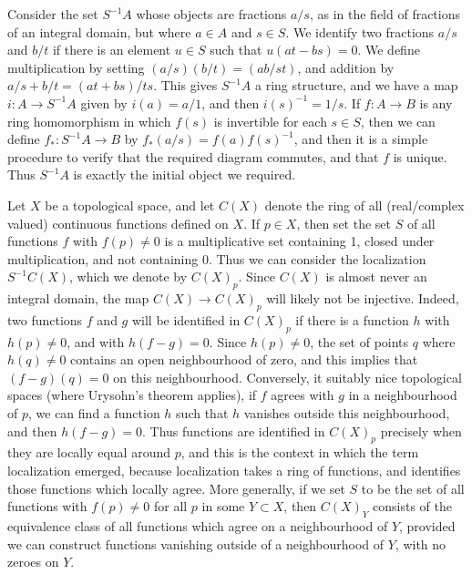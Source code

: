 Consider the set $S^{-1}A$ whose objects are fractions $a/s$, as in the field of fractions of an integral domain, but where $a \in A$ and $s \in S$. We identify two fractions $a/s$ and $b/t$ if there is an element $u \in S$ such that $u(at - bs) = 0$. We define multiplication by setting $(a/s)(b/t) = (ab/st)$, and addition by $a/s + b/t = (at + bs)/ts$. This gives $S^{-1}A$ a ring structure, and we have a map $i: A \to S^{-1}A$ given by $i(a) = a/1$, and then $i(s)^{-1} = 1/s$. If $f: A \to B$ is any ring homomorphism in which $f(s)$ is invertible for each $s \in S$, then we can define $f_*: S^{-1}A \to B$ by $f_*(a/s) = f(a)f(s)^{-1}$, and then it is a simple procedure to verify that the required diagram commutes, and that $f$ is unique. Thus $S^{-1}A$ is exactly the initial object we required.

\begin{example}
    Let $X$ be a topological space, and let $C(X)$ denote the ring of all (real/complex valued) continuous functions defined on $X$. If $p \in X$, then set the set $S$ of all functions $f$ with $f(p) \neq 0$ is a multiplicative set containing 1, closed under multiplication, and not containing 0. Thus we can consider the localization $S^{-1}C(X)$, which we denote by $C(X)_p$. Since $C(X)$ is almost never an integral domain, the map $C(X) \to C(X)_p$ will likely not be injective. Indeed, two functions $f$ and $g$ will be identified in $C(X)_p$ if there is a function $h$ with $h(p) \neq 0$, and with $h(f-g) = 0$. Since $h(p) \neq 0$, the set of points $q$ where $h(q) \neq 0$ contains an open neighbourhood of zero, and this implies that $(f - g)(q) = 0$ on this neighbourhood. Conversely, it suitably nice topological spaces (where Urysohn's theorem applies), if $f$ agrees with $g$ in a neighbourhood of $p$, we can find a function $h$ such that $h$ vanishes outside this neighbourhood, and then $h(f - g) = 0$. Thus functions are identified in $C(X)_p$ precisely when they are locally equal around $p$, and this is the context in which the term localization emerged, because localization takes a ring of functions, and identifies those functions which locally agree. More generally, if we set $S$ to be the set of all functions with $f(p) \neq 0$ for all $p$ in some $Y \subset X$, then $C(X)_Y$ consists of the equivalence class of all functions which agree on a neighbourhood of $Y$, provided we can construct functions vanishing outside of a neighbourhood of $Y$, with no zeroes on $Y$.
\end{example}

